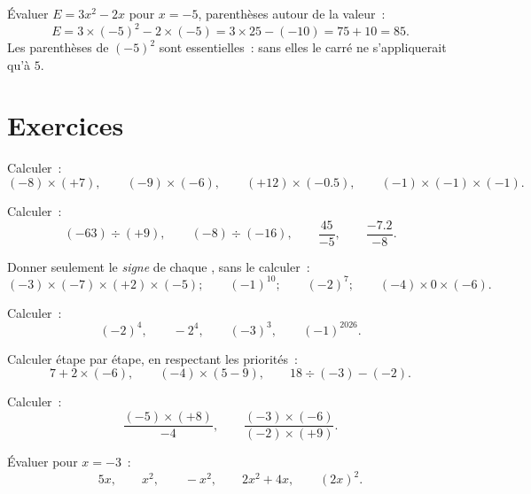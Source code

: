 \begin{example}\label{ex:g8:negprod:substitute}
Évaluer $E = 3x^2 - 2x$ pour $x = -5$, parenthèses autour de la
valeur~:
\[
E = 3 \times (-5)^2 - 2 \times (-5)
= 3 \times 25 - (-10)
= 75 + 10 = 85 .
\]
Les parenthèses de $(-5)^2$ sont essentielles~: sans elles le carré
ne s'appliquerait qu'à $5$.
\end{example}

\section{Exercices}

\begin{exercise}[$\star$]\label{exo:g8:negprod:1}
Calculer~:
\[
(-8) \times (+7), \qquad
(-9) \times (-6), \qquad
(+12) \times (-0.5), \qquad
(-1) \times (-1) \times (-1).
\]
\end{exercise}

\begin{exercise}[$\star$]\label{exo:g8:negprod:2}
Calculer~:
\[
(-63) \div (+9), \qquad
(-8) \div (-16), \qquad
\frac{45}{-5}, \qquad
\frac{-7.2}{-8} .
\]
\end{exercise}

\begin{exercise}[$\star$]\label{exo:g8:negprod:3}
Donner seulement le \emph{signe} de chaque , sans le
calculer~:
\[
(-3) \times (-7) \times (+2) \times (-5); \qquad
(-1)^{10}; \qquad
(-2)^{7}; \qquad
(-4) \times 0 \times (-6).
\]
\end{exercise}

\begin{exercise}[$\star$]\label{exo:g8:negprod:4}
Calculer~:
\[
(-2)^4, \qquad
-2^4, \qquad
(-3)^3, \qquad
(-1)^{2026} .
\]
\end{exercise}

\begin{exercise}[$\star$]\label{exo:g8:negprod:5}
Calculer étape par étape, en respectant les priorités~:
\[
7 + 2 \times (-6), \qquad
(-4) \times (5 - 9), \qquad
18 \div (-3) - (-2) .
\]
\end{exercise}

\begin{exercise}[$\star$]\label{exo:g8:negprod:6}
Calculer~:
\[
\frac{(-5) \times (+8)}{-4}, \qquad
\frac{(-3) \times (-6)}{(-2) \times (+9)} .
\]
\end{exercise}

\begin{exercise}[$\star$]\label{exo:g8:negprod:7}
Évaluer pour $x = -3$~:
\[
5x, \qquad x^2, \qquad -x^2, \qquad 2x^2 + 4x, \qquad (2x)^2 .
\]
\end{exercise}


